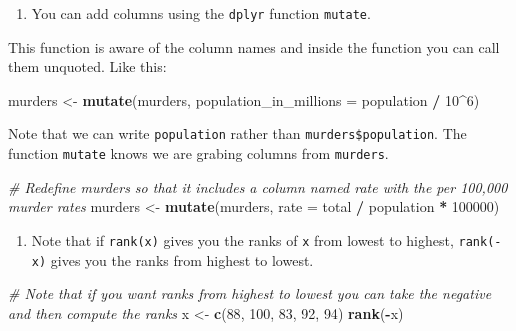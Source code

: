 \documentclass[]{article}
\newenvironment{Shaded}{\begin{snugshade}}{\end{snugshade}}
\newcommand{\CommentTok}[1]{\textcolor[rgb]{0.56,0.35,0.01}{\textit{#1}}}
\newcommand{\DataTypeTok}[1]{\textcolor[rgb]{0.13,0.29,0.53}{#1}}
\newcommand{\DecValTok}[1]{\textcolor[rgb]{0.00,0.00,0.81}{#1}}
\newcommand{\KeywordTok}[1]{\textcolor[rgb]{0.13,0.29,0.53}{\textbf{#1}}}
\newcommand{\NormalTok}[1]{#1}
\newcommand{\OperatorTok}[1]{\textcolor[rgb]{0.81,0.36,0.00}{\textbf{#1}}}
\newcommand{\StringTok}[1]{\textcolor[rgb]{0.31,0.60,0.02}{#1}}
\providecommand{\tightlist}{%
  \setlength{\itemsep}{0pt}\setlength{\parskip}{0pt}}
\begin{document}
\begin{enumerate}
\def\labelenumi{\arabic{enumi}.}
\tightlist
\item
  You can add columns using the \texttt{dplyr} function \texttt{mutate}.
\end{enumerate}

This function is aware of the column names and inside the function you
can call them unquoted. Like this:

\begin{Shaded}
\begin{Highlighting}[]
\NormalTok{murders <-}\StringTok{ }\KeywordTok{mutate}\NormalTok{(murders, }\DataTypeTok{population_in_millions =}\NormalTok{ population }\OperatorTok{/}\StringTok{ }\DecValTok{10}\OperatorTok{^}\DecValTok{6}\NormalTok{)}
\end{Highlighting}
\end{Shaded}

Note that we can write \texttt{population} rather than
\texttt{murders\$population}. The function \texttt{mutate} knows we are
grabing columns from \texttt{murders}.

\begin{Shaded}
\begin{Highlighting}[]
\CommentTok{# Redefine murders so that it includes a column named rate with the per 100,000 murder rates}
\NormalTok{murders <-}\StringTok{ }\KeywordTok{mutate}\NormalTok{(murders, }\DataTypeTok{rate =}\NormalTok{ total }\OperatorTok{/}\StringTok{ }\NormalTok{population }\OperatorTok{*}\StringTok{ }\DecValTok{100000}\NormalTok{)}
\end{Highlighting}
\end{Shaded}

\begin{enumerate}
\def\labelenumi{\arabic{enumi}.}
\setcounter{enumi}{1}
\tightlist
\item
  Note that if \texttt{rank(x)} gives you the ranks of \texttt{x} from
  lowest to highest, \texttt{rank(-x)} gives you the ranks from highest
  to lowest.
\end{enumerate}

\begin{Shaded}
\begin{Highlighting}[]
\CommentTok{# Note that if you want ranks from highest to lowest you can take the negative and then compute the ranks }
\NormalTok{x <-}\StringTok{ }\KeywordTok{c}\NormalTok{(}\DecValTok{88}\NormalTok{, }\DecValTok{100}\NormalTok{, }\DecValTok{83}\NormalTok{, }\DecValTok{92}\NormalTok{, }\DecValTok{94}\NormalTok{)}
\KeywordTok{rank}\NormalTok{(}\OperatorTok{-}\NormalTok{x)}
\end{Highlighting}
\end{Shaded}
\end{document}

